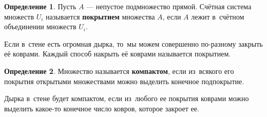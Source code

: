 \documentclass[pdftex, 12pt, a4paper]{article}
\theoremstyle{definition} %
\newtheorem*{mydef}{Определение}
\numberwithin{problem}{section}
\newcommand{\indef}[1]{\textbf{#1}}
\numberwithin{blits}{section}
\begin{document}
\begin{mydef} Пусть $A$ --- непустое подмножество прямой. Счётная система множеств $U_i$ называется \indef{покрытием}   множества $A$, если $A$ лежит в~счётном объединении множеств $U_i$.
\end{mydef}

Если в~стене есть огромная дырка, то~мы можем совершенно по-разному закрыть её коврами. Каждый способ накрыть её коврами называется покрытием.

\begin{mydef}Множество называется \indef{компактом},   если из~всякого его покрытия открытыми множествами можно выделить конечное подпокрытие.  
\end{mydef}

Дырка в~стене будет компактом, если из~любого ее покрытия коврами можно выделить какое-то конечное число ковров, которое закроет ее.
\end{document}
